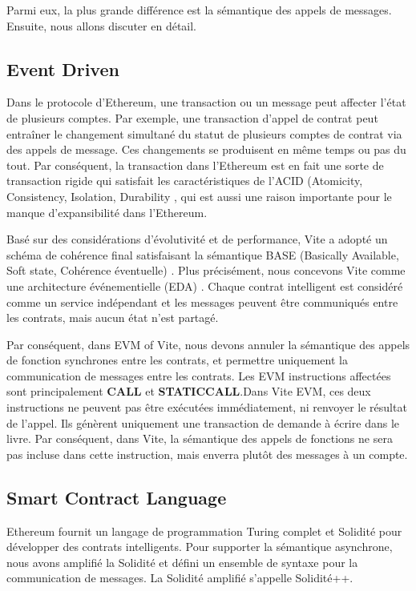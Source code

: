 \documentclass[UTF8,nofonts]{article}
\begin{document}
\begin{multicols}{2}
Parmi eux, la plus grande différence est la sémantique des appels de messages. Ensuite, nous allons discuter en détail.

\subsection{Event Driven}
Dans le protocole d'Ethereum, une transaction ou un message peut affecter l'état de plusieurs comptes. Par exemple, une transaction d'appel de contrat peut entraîner le changement simultané du statut de plusieurs comptes de contrat via des appels de message. Ces changements se produisent en même temps ou pas du tout. Par conséquent, la transaction dans l'Ethereum est en fait une sorte de transaction rigide qui satisfait les caractéristiques de l'ACID (Atomicity, Consistency, Isolation, Durability \cite{Haerder:1983:PTD:289.291}, qui est aussi une raison importante pour le manque d'expansibilité dans l'Ethereum.

Basé sur des considérations d'évolutivité et de performance, Vite a adopté un schéma de cohérence final satisfaisant la sémantique BASE (Basically Available, Soft state, Cohérence éventuelle) \cite{Pritchett:2008:BAA:1394127.1394128}. Plus précisément, nous concevons Vite comme une architecture événementielle (EDA) \cite{eda}.  Chaque contrat intelligent est considéré comme un service indépendant et les messages peuvent être communiqués entre les contrats, mais aucun état n'est partagé.

Par conséquent, dans EVM of Vite, nous devons annuler la sémantique des appels de fonction synchrones entre les contrats, et permettre uniquement la communication de messages entre les contrats. Les EVM instructions affectées sont principalement \textbf{CALL} et \textbf{STATICCALL}.Dans Vite EVM, ces deux instructions ne peuvent pas être exécutées immédiatement, ni renvoyer le résultat de l'appel. Ils génèrent uniquement une transaction de demande à écrire dans le livre. Par conséquent, dans Vite, la sémantique des appels de fonctions ne sera pas incluse dans cette instruction, mais enverra plutôt des messages à un compte.


\subsection{Smart Contract Language}
Ethereum fournit un langage de programmation Turing complet et Solidité pour développer des contrats intelligents. Pour supporter la sémantique asynchrone, nous avons amplifié la Solidité et défini un ensemble de syntaxe pour la communication de messages. La Solidité amplifié s'appelle Solidité++.


\end{multicols}
\end{document}
